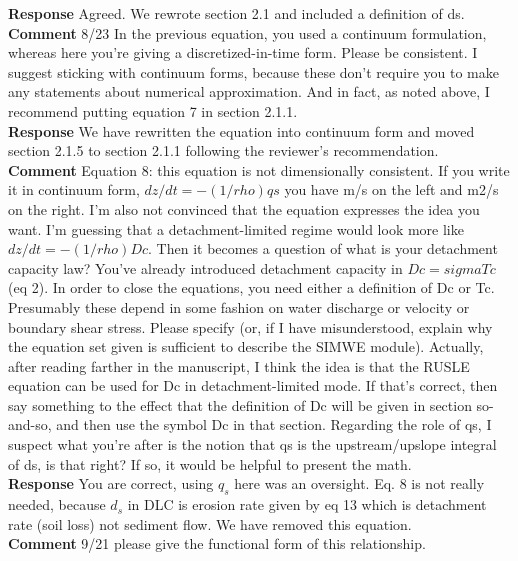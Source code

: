 \documentclass[gmd, manuscript]{copernicus}
\begin{document}
\noindent\textbf{Response}
Agreed. We rewrote section 2.1 and included a definition of ds.
\\

\noindent\textbf{Comment}
8/23 In the previous equation, you used a continuum formulation, whereas here you’re giving a discretized-in-time form. Please be consistent. I suggest sticking with continuum forms, because these don’t require you to make any statements about numerical approximation. And in fact, as noted above, I recommend putting equation 7 in section 2.1.1.
\\

\noindent\textbf{Response}
We have rewritten the equation into continuum form and moved section 2.1.5 to section 2.1.1 following the reviewer’s recommendation.
\\

\noindent\textbf{Comment}
Equation 8: this equation is not dimensionally consistent. If you write it in continuum form, $dz/dt = -(1/rho) qs$ you have m/s on the left and m2/s on the right. I’m also not convinced that the equation expresses the idea you want. I’m guessing that a detachment-limited regime would look more like $dz/dt = -(1/rho) Dc$. Then it becomes a question of what is your detachment capacity law? You’ve already introduced detachment capacity in $Dc = sigma Tc$ (eq 2). In order to close the equations, you need either a definition of Dc or Tc. Presumably these depend in some fashion on water discharge or velocity or boundary shear stress. Please specify (or, if I have misunderstood, explain why the equation set given is sufficient to describe the SIMWE module). Actually, after reading farther in the manuscript, I think the idea is that the RUSLE equation can be used for Dc in detachment-limited mode. If that’s correct, then say something to the effect that the definition of Dc will be given in section so-and-so, and then use the symbol Dc in that section. Regarding the role of qs, I suspect what you’re after is the notion that qs is the upstream/upslope integral of ds, is that right? If so, it would be helpful to present the math.
\\

\noindent\textbf{Response}
You are correct, using $q_s$ here was an oversight. Eq. 8 is not really needed, because $d_s$ in  DLC is erosion rate given by eq 13 which is detachment rate (soil loss)  not sediment flow. We have removed this equation.
\\

\noindent\textbf{Comment}
9/21 please give the functional form of this relationship.
\\
\end{document}
